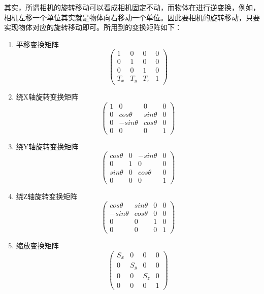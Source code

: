 	\begin{spacing}{2.5}
	其实，所谓相机的旋转移动可以看成相机固定不动，而物体在进行逆变换，例如，相机左移一个单位其实就是物体向右移动一个单位。因此要相机的旋转移动，只要实现物体对应的旋转移动即可。所用到的变换矩阵如下：
	\begin{enumerate}
		\item 平移变换矩阵
		\begin{equation}
		\begin{pmatrix}
			1 &  0&  0&0 \\ 
 			0&  1&  0& 0\\ 
 			0& 0 & 1 &0 \\ 
 			T_{x}&  T_{y}&  T_{z}& 1
		\end{pmatrix}
		\label{transfer_1}
		\end{equation}
		\item 	绕X轴旋转变换矩阵
		\begin{equation}
		\begin{pmatrix}
			 1&  0&  0 &0 \\ 
 			0&  cos\theta &  sin\theta& 0\\ 
 			 0& -sin\theta & cos\theta &0 \\ 
 			0&  0&  0& 1
		\end{pmatrix}
		\label{yrotate}
		\end{equation}
		\item 绕Y轴旋转变换矩阵
		\begin{equation}
		\begin{pmatrix}
			cos\theta &  0&  -sin\theta &0 \\ 
 			0&  1&  0& 0\\ 
 			sin\theta & 0 & cos\theta &0 \\ 
 			0&  0&  0& 1
		\end{pmatrix}
		\label{xrotate}	
		\end{equation}
	
		\item 绕Z轴旋转变换矩阵
		\begin{equation}
		\begin{pmatrix}
			cos\theta &  sin\theta &  0 &0 \\ 
 			-sin\theta &  cos\theta &  0& 0\\ 
 			0 & 0 & 1 &0 \\ 
 			0&  0&  0& 1
		\end{pmatrix}
		\label{zrotate}
		\end{equation}
		\item 缩放变换矩阵
		\begin{equation}
		\begin{pmatrix}
			S_{x}& 0 &  0 &0 \\ 
 			0 &  S_{y} &  0& 0\\ 
 			0 & 0 & S_{z} &0 \\ 
 			0&  0&  0& 1
		\end{pmatrix}
		\label{zrotate}
		\end{equation}
	\end{enumerate}
	\end{spacing}

